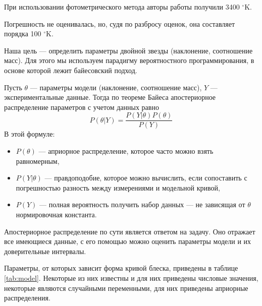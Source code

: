 При использовании фотометрического метода авторы работы \cite{TCRBtemperature} получили 3400 ${}^\circ$K.

Погрешность не оценивалась, но, судя по разбросу оценок, она составляет порядка 100 ${}^\circ$K.






Наша цель --- определить параметры двойной звезды (наклонение, соотношение масс). Для этого мы используем парадигму вероятностного программирования, в основе которой лежит байесовский подход.

Пусть $\theta$ --- параметры модели (наклонение, соотношение масс), $Y$ --- экспериментальные данные. Тогда по теореме Байеса апостериорное распределение параметров с учетом данных равно
\begin{equation}
P(\theta | Y) = \frac{P(Y | \theta) P(\theta)}{P(Y)}
\label{eq:bayes}
\end{equation}
В этой формуле:
\begin{itemize}
    \item $P(\theta)$ --- априорное распределение, которое часто можно взять равномерным,
    \item $P(Y | \theta)$ --- правдоподобие, которое можно вычислить, если сопоставить с погрешностью разность между измерениями и модельной кривой,
    \item $P(Y)$ --- полная вероятность получить набор данных --- не зависящая от $\theta$ нормировочная константа.
\end{itemize}

Апостериорное распределение по сути является ответом на задачу. Оно отражает все имеющиеся данные, с его помощью можно оценить параметры модели и их доверительные интервалы.



Параметры, от которых зависит форма кривой блеска, приведены в таблице \ref{tab:model}. Некоторые из них известны и для них приведены числовые значения, некоторые являются случайными переменными, для них приведены априорные распределения.

